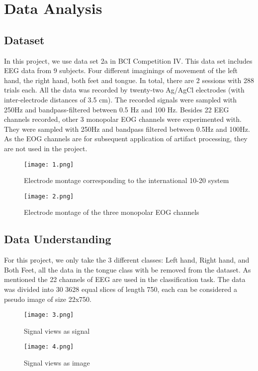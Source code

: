 \documentclass[]{report}
\begin{document}
\newpage
\chapter*{Data Analysis}
\section{Dataset}
In this project, we use data set 2a in BCI Competition IV\cite{brunner2008}. This data set includes EEG data from 9 subjects. Four different imaginings of movement of the left hand, the right hand, both feet and tongue. In total, there are 2 sessions with 288 trials each. All the data was recorded by twenty-two Ag/AgCl electrodes (with inter-electrode distances of 3.5 cm). The recorded signals were sampled with 250Hz and bandpass-filtered between 0.5 Hz and 100 Hz. Besides 22 EEG channels recorded, other 3 monopolar EOG channels were experimented with. They were sampled with 250Hz and bandpass filtered between 0.5Hz and 100Hz. As the EOG channels are for subsequent application of artifact processing, they are not used in the project. 
\begin{figure}[H]
  \centering
  \begin{minipage}[b]{0.4\textwidth}
    \texttt{[image: 1.png]}
    \caption{Electrode montage corresponding to the international 10-20
system}
  \end{minipage}
  \hfill
  \centering
  \begin{minipage}[b]{0.4\textwidth}
    \texttt{[image: 2.png]}
    \caption{ Electrode montage of the three monopolar EOG channels}
  \end{minipage}
\end{figure}
\section{Data Understanding}
For this project, we only take the 3 different classes: Left hand, Right hand, and Both Feet, all the data in the tongue class with be removed from the dataset. As mentioned the 22 channels of EEG are used in the classification task. The data was divided into 30 3628  equal slices of length 750, each can be considered a pseudo image of size 22x750. 
\begin{figure}[H]
  \centering
  \begin{minipage}[b]{0.4\textwidth}
    \texttt{[image: 3.png]}
    \caption{Signal views as signal}
  \end{minipage}
  \hfill
  \centering
  \begin{minipage}[b]{0.4\textwidth}
    \texttt{[image: 4.png]}
    \caption{Signal views as image}
  \end{minipage}
\end{figure}
\end{document}
